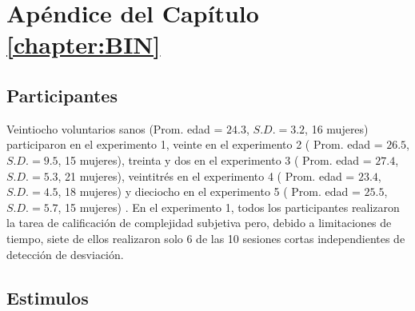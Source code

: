 \chapter{Apéndice del Capítulo \ref{chapter:BIN}}
\label{app:BIN}


\section{Participantes}


Veintiocho voluntarios sanos (Prom. edad = $24.3$, $S.D. = 3.2$, 16 mujeres) participaron en el experimento 1, veinte en el experimento 2 ( Prom. edad = $26.5$, $S.D. = 9.5$, 15 mujeres), treinta y dos en el experimento 3 ( Prom. edad = $27.4$, $S.D. = 5.3$, 21 mujeres), veintitrés en el experimento 4 ( Prom. edad = $23.4$, $S.D. = 4.5$, 18 mujeres) y dieciocho en el experimento 5 ( Prom. edad = $25.5$, $S.D. = 5.7$, 15 mujeres) . En el experimento 1, todos los participantes realizaron la tarea de calificación de complejidad subjetiva pero, debido a limitaciones de tiempo, siete de ellos realizaron solo 6 de las 10 sesiones cortas independientes de detección de desviación.

\section{Estimulos}

